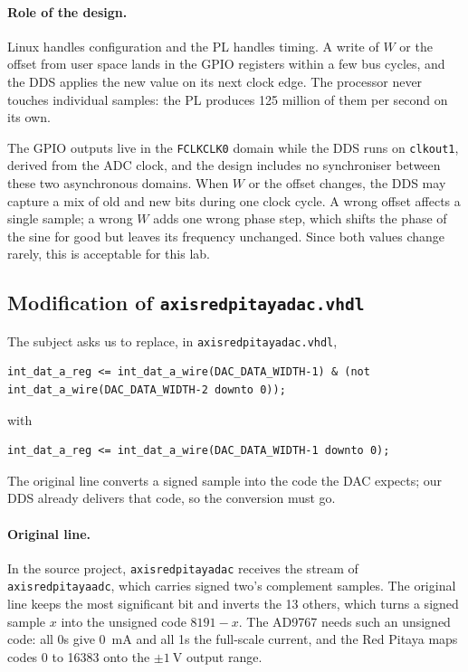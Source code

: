 \documentclass[11pt,a4paper]{article}
\renewcommand{\_}{\oldunderscore\allowbreak}
\begin{document}
\paragraph{Role of the design.} Linux handles configuration and the PL handles
timing. A write of $W$ or the offset from user space lands in the GPIO registers
within a few bus cycles, and the DDS applies the new value on its next clock edge.
The processor never touches individual samples: the PL produces 125 million of them
per second on its own.

The GPIO outputs live in the \texttt{FCLK\_CLK0} domain while the DDS runs on
\texttt{clk\_out1}, derived from the ADC clock, and the design includes no
synchroniser between these two asynchronous domains. When $W$ or the offset changes,
the DDS may capture a mix of old and new bits during one clock cycle. A wrong offset
affects a single sample; a wrong $W$ adds one wrong phase step, which shifts the phase
of the sine for good but leaves its frequency unchanged. Since both values change
rarely, this is acceptable for this lab.

\subsection{Modification of \texttt{axis\_red\_pitaya\_dac.vhdl}}
The subject asks us to replace, in \texttt{axis\_red\_pitaya\_dac.vhdl},
\begin{lstlisting}[style=vhdl]
int_dat_a_reg <= int_dat_a_wire(DAC_DATA_WIDTH-1) & (not int_dat_a_wire(DAC_DATA_WIDTH-2 downto 0));
\end{lstlisting}
with
\begin{lstlisting}[style=vhdl]
int_dat_a_reg <= int_dat_a_wire(DAC_DATA_WIDTH-1 downto 0);
\end{lstlisting}

The original line converts a signed sample into the code the DAC expects; our DDS
already delivers that code, so the conversion must go.

\paragraph{Original line.} In the source project, \texttt{axis\_red\_pitaya\_dac}
receives the stream of \texttt{axis\_red\_pitaya\_adc}, which carries signed two's
complement samples. The original line keeps the most significant bit and inverts the
13 others, which turns a signed sample $x$ into the unsigned code $8191 - x$. The
AD9767 needs such an unsigned code: all 0s give \SI{0}{\milli\ampere} and all 1s the
full-scale current, and the Red Pitaya maps codes 0 to 16383 onto the
$\pm\SI{1}{\volt}$ output range.
\end{document}
